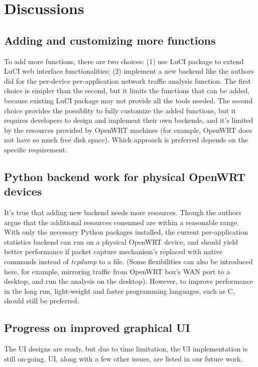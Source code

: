 \section{Discussions}

\subsection{Adding and customizing more functions}
To add more functions, there are two choices: (1) use LuCI package to extend LuCI web interface functionalities; (2) implement a new backend like the authors did for the per-device per-application network traffic analysis function. The first choice is simpler than the second, but it limits the functions that can be added, because existing LuCI package may not provide all the tools needed. The second choice provides the possiblity to fully customize the added functions, but it requires developers to design and implement their own backends, and it's limited by the resources provided by OpenWRT machines (for example, OpenWRT does not have so much free disk space). Which approach is preferred depends on the specific requirement.

\subsection{Python backend work for physical OpenWRT devices}

It's true that adding new backend needs more resources. Though the authors argue that the additional resources consumed are within a reasonable range. With only the necessary Python packages installed, the current per-application statistics backend can run on a physical OpenWRT device, and should yield better performance if packet capture mechanism's replaced with native commands instead of \textit{tcpdump} to a file. (Some flexibilities can also be introduced here, for example, mirroring traffic from OpenWRT box's WAN port to a desktop, and run the analysis on the desktop). However, to improve performance in the long run, light-weight and faster programming languages, such as C, should still be preferred.

\subsection{Progress on improved graphical UI}

The UI designs are ready, but due to time limitation, the UI implementation is still on-going. UI, along with a few other issues, are listed in our future work.